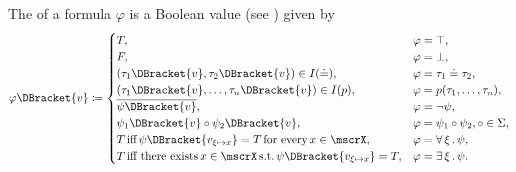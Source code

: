 \begin{definition}
\begin{DefEnum}
     The  of a formula \( \varphi \) is a Boolean value (see ) given by
    \begin{equation}\label{eq:def:first_order_valuation/formula_valuation}
      \varphi\DBracket{v} \coloneqq \begin{cases}
        T,                                                                              &\varphi = \top, \\
        F,                                                                              &\varphi = \bot, \\
        (\tau_1\DBracket{v}, \tau_2\DBracket{v}) \in I(\doteq),                         &\varphi = \tau_1 \doteq \tau_2, \\
        (\tau_1\DBracket{v}, \ldots, \tau_n\DBracket{v}) \in I(p),                      &\varphi = p(\tau_1, \ldots, \tau_n), \\
        \overline{\psi\DBracket{v}},                                                          &\varphi = \neg \psi, \\
        \psi_1\DBracket{v} \circ \psi_2\DBracket{v},                                    &\varphi = \psi_1 \circ \psi_2, \circ \in \Sigma, \\
        T \T{iff} \psi\DBracket{v_{\xi \mapsto x}} = T \T{for every} x \in \mscrX,         &\varphi = \ForAll{\xi} \psi, \\
        T \T{iff there exists} x \in \mscrX \T{s.t.} \psi\DBracket{v_{\xi \mapsto x}} = T, &\varphi = \Exists{\xi} \psi.
      \end{cases}
    \end{equation}
  \end{DefEnum}
\end{definition}

